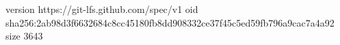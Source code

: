 version https://git-lfs.github.com/spec/v1
oid sha256:2ab98d3f6632684c8cc45180fb8dd908332ce37f45c5ed59fb796a9cac7a4a92
size 3643
